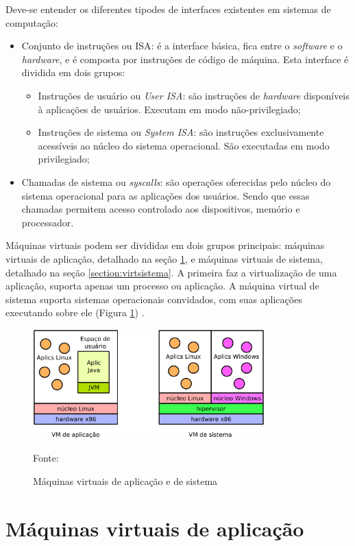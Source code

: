 Deve-se entender os diferentes tipodes de interfaces existentes em sistemas de computação:
\begin{itemize}
 \item Conjunto de instruções ou \ac{ISA}: é a interface básica, fica entre o \textit{software} e o \textit{hardware}, e é composta por 
 instruções de código de máquina. Esta interface é dividida em dois grupos:
 \begin{itemize}
  \item Instruções de usuário ou \textit{User \ac{ISA}}: são instruções de \textit{hardware} disponíveis à aplicações de usuários. Executam
  em modo não-privilegiado;
  \item Instruções de sistema ou \textit{System \ac{ISA}}: são instruções exclusivamente acessíveis ao núcleo do sistema operacional. 
  São executadas em modo privilegiado;
 \end{itemize}
 \item Chamadas de sistema ou \textit{syscalls}: são operações oferecidas pelo núcleo do sistema operacional para as aplicações dos usuários.
 Sendo que essas chamadas permitem acesso controlado aos dispositivos, memório e processador.
\end{itemize}

Máquinas virtuais podem ser divididas em dois grupos principais: máquinas virtuais de aplicação, detalhado na seção 
\ref{section:virtaplicacao}, e máquinas virtuais de sistema, detalhado na seção \ref{section:virtsistema}. A primeira faz a virtualização 
de uma aplicação, suporta apenas um processo ou aplicação. A máquina virtual de sistema suporta sistemas operacionais convidados, com suas 
aplicações executando sobre ele (Figura \ref{fig:vms_tipos}) \cite{laureano2008}.

\begin{figure}[vms_tipos]
 \centering
 \includegraphics[height=160px]{img/vms_tipos.eps}
 \caption{Máquinas virtuais de aplicação e de sistema}
 \label{fig:vms_tipos}
 Fonte: \citet{laureano2008}
\end{figure}

\section{Máquinas virtuais de aplicação}
\label{section:virtaplicacao}


